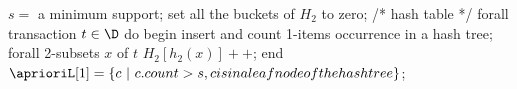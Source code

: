 $s=$ a minimum support;
set all the buckets of $H_2$ to zero; /* hash table */
forall transaction $t\in \D$ do begin
	insert and count 1-items occurrence in a hash tree;
	forall 2-subsets $x$ of $t$
		$H_2[h_2(x)]++$;
end
$\aprioriL[1] = \{c\ |\  c.count>s, c is in a leaf node of the hash tree\}$;
